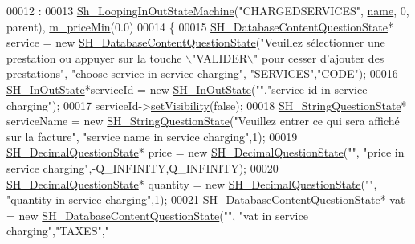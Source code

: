 \begin{DoxyCode}
00012                                                                     :
00013     \hyperlink{classSh__LoopingInOutStateMachine_a5de32ba5bb4fd034036a16665f91cdb4}{Sh\_LoopingInOutStateMachine}(\textcolor{stringliteral}{"CHARGEDSERVICES"},
      \hyperlink{classSH__NamedObject_a970f265df31b28b2179bbbceb6170ac2}{name}, 0, parent), \hyperlink{classSH__ServiceCharging_a44584a7ff1edd6ae03c4f77544136c13}{m\_priceMin}(0.0)
00014 \{
00015     \hyperlink{classSH__DatabaseContentQuestionState}{SH\_DatabaseContentQuestionState}* service = \textcolor{keyword}{new} 
      \hyperlink{classSH__DatabaseContentQuestionState}{SH\_DatabaseContentQuestionState}(\textcolor{stringliteral}{"Veuillez sélectionner une prestation ou
       appuyer sur la touche \(\backslash\)"VALIDER\(\backslash\)" pour cesser d'ajouter des prestations"}, \textcolor{stringliteral}{"choose service in service charging"},\textcolor{stringliteral}{
      "SERVICES"},\textcolor{stringliteral}{"CODE"});
00016     \hyperlink{classSH__InOutState}{SH\_InOutState}*serviceId = \textcolor{keyword}{new} \hyperlink{classSH__InOutState}{SH\_InOutState}(\textcolor{stringliteral}{""},\textcolor{stringliteral}{"service id in service
       charging"});
00017     serviceId->\hyperlink{classSH__InOutState_a7706a2ea1367ab3416db27fa0f4794f7}{setVisibility}(\textcolor{keyword}{false});
00018     \hyperlink{classSH__StringQuestionState}{SH\_StringQuestionState}* serviceName = \textcolor{keyword}{new} 
      \hyperlink{classSH__StringQuestionState}{SH\_StringQuestionState}(\textcolor{stringliteral}{"Veuillez entrer ce qui sera affiché sur la facture"}, \textcolor{stringliteral}{"service
       name in service charging"},1);
00019     \hyperlink{classSH__DecimalQuestionState}{SH\_DecimalQuestionState}* price = \textcolor{keyword}{new} 
      \hyperlink{classSH__DecimalQuestionState}{SH\_DecimalQuestionState}(\textcolor{stringliteral}{""}, \textcolor{stringliteral}{"price in service charging"},-Q\_INFINITY,Q\_INFINITY);
00020     \hyperlink{classSH__DecimalQuestionState}{SH\_DecimalQuestionState}* quantity = \textcolor{keyword}{new} 
      \hyperlink{classSH__DecimalQuestionState}{SH\_DecimalQuestionState}(\textcolor{stringliteral}{""}, \textcolor{stringliteral}{"quantity in service charging"},1);
00021     \hyperlink{classSH__DatabaseContentQuestionState}{SH\_DatabaseContentQuestionState}* vat = \textcolor{keyword}{new} 
      \hyperlink{classSH__DatabaseContentQuestionState}{SH\_DatabaseContentQuestionState}(\textcolor{stringliteral}{""}, \textcolor{stringliteral}{"vat in service charging"},\textcolor{stringliteral}{"TAXES"},\textcolor{stringliteral}{"
}
\end{DoxyCode}
